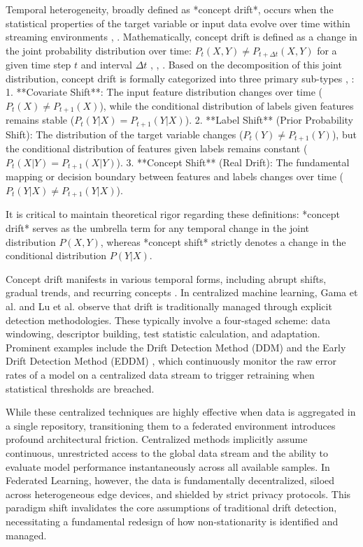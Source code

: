 \documentclass[journal]{IEEEtran}
\begin{document}
Temporal heterogeneity, broadly defined as *concept drift*, occurs when the statistical properties of the target variable or input data evolve over time within streaming environments \cite{Mannapur2025}, \cite{Agrahari2021}. Mathematically, concept drift is defined as a change in the joint probability distribution over time: $P_t(X, Y) \neq P_{t+\Delta t}(X, Y)$ for a given time step $t$ and interval $\Delta t$ \cite{Hinder2023}, \cite{Mannapur2025}, \cite{paper803}. Based on the decomposition of this joint distribution, concept drift is formally categorized into three primary sub-types \cite{paper806}, \cite{paper807}:
1. **Covariate Shift**: The input feature distribution changes over time ($P_t(X) \neq P_{t+1}(X)$), while the conditional distribution of labels given features remains stable ($P_t(Y|X) = P_{t+1}(Y|X)$).
2. **Label Shift** (Prior Probability Shift): The distribution of the target variable changes ($P_t(Y) \neq P_{t+1}(Y)$), but the conditional distribution of features given labels remains constant ($P_t(X|Y) = P_{t+1}(X|Y)$).
3. **Concept Shift** (Real Drift): The fundamental mapping or decision boundary between features and labels changes over time ($P_t(Y|X) \neq P_{t+1}(Y|X)$). 

It is critical to maintain theoretical rigor regarding these definitions: *concept drift* serves as the umbrella term for any temporal change in the joint distribution $P(X,Y)$, whereas *concept shift* strictly denotes a change in the conditional distribution $P(Y|X)$. 

Concept drift manifests in various temporal forms, including abrupt shifts, gradual trends, and recurring concepts \cite{Prasad2024}. In centralized machine learning, Gama et al. \cite{Hinder2024} and Lu et al. \cite{paper808} observe that drift is traditionally managed through explicit detection methodologies. These typically involve a four-staged scheme: data windowing, descriptor building, test statistic calculation, and adaptation. Prominent examples include the Drift Detection Method (DDM) and the Early Drift Detection Method (EDDM) \cite{paper809}, which continuously monitor the raw error rates of a model on a centralized data stream to trigger retraining when statistical thresholds are breached.

While these centralized techniques are highly effective when data is aggregated in a single repository, transitioning them to a federated environment introduces profound architectural friction. Centralized methods implicitly assume continuous, unrestricted access to the global data stream and the ability to evaluate model performance instantaneously across all available samples. In Federated Learning, however, the data is fundamentally decentralized, siloed across heterogeneous edge devices, and shielded by strict privacy protocols. This paradigm shift invalidates the core assumptions of traditional drift detection, necessitating a fundamental redesign of how non-stationarity is identified and managed.
\end{document}
